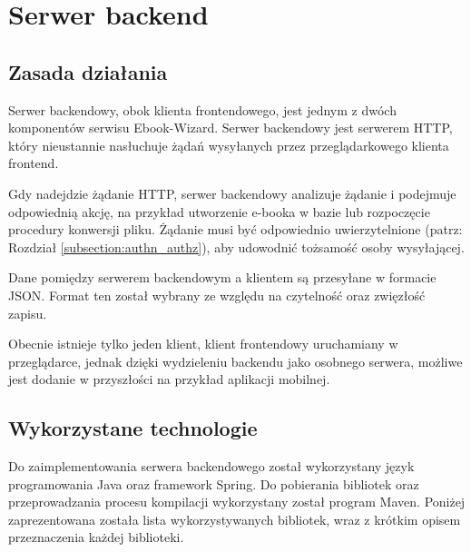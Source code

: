 \section{Serwer backend}

\subsection{Zasada działania}

Serwer backendowy, obok klienta frontendowego, jest jednym z dwóch komponentów serwisu Ebook-Wizard. Serwer backendowy jest serwerem HTTP, który nieustannie nasłuchuje żądań wysyłanych przez przeglądarkowego klienta frontend.

Gdy nadejdzie żądanie HTTP, serwer backendowy analizuje żądanie i podejmuje odpowiednią akcję, na przykład utworzenie e-booka w bazie lub rozpoczęcie procedury konwersji pliku. Żądanie musi być odpowiednio uwierzytelnione (patrz: Rozdział \ref{subsection:authn_authz}), aby udowodnić tożsamość osoby wysyłającej.

Dane pomiędzy serwerem backendowym a klientem są przesyłane w formacie JSON. Format ten został wybrany ze względu na czytelność oraz zwięzłość zapisu.

Obecnie istnieje tylko jeden klient, klient frontendowy uruchamiany w przeglądarce, jednak dzięki wydzieleniu backendu jako osobnego serwera, możliwe jest dodanie w przyszłości na przykład aplikacji mobilnej.

\subsection{Wykorzystane technologie}

Do zaimplementowania serwera backendowego został wykorzystany język programowania Java oraz framework Spring. \cite{spring_in_action_book} Do pobierania bibliotek oraz przeprowadzania procesu kompilacji wykorzystany został program Maven. \cite{maven_guide} Poniżej zaprezentowana została lista wykorzystywanych bibliotek, wraz z krótkim opisem przeznaczenia każdej biblioteki.

